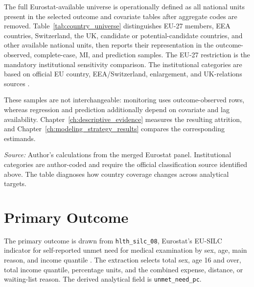 The full Eurostat-available universe is operationally defined as all national units present in the selected outcome and covariate tables after aggregate codes are removed. Table~\ref{tab:country_universe} distinguishes EU-27 members, EEA countries, Switzerland, the UK, candidate or potential-candidate countries, and other available national units, then reports their representation in the outcome-observed, complete-case, MI, and prediction samples. The EU-27 restriction is the mandatory institutional sensitivity comparison. The institutional categories are based on official EU country, EEA/Switzerland, enlargement, and UK-relations sources \citep{eu_countries_2026,europarl_eea_switzerland_2025,european_commission_enlargement_2026,european_commission_uk_relations_2026}.

These samples are not interchangeable: monitoring uses outcome-observed rows, whereas regression and prediction additionally depend on covariate and lag availability. Chapter~\ref{ch:descriptive_evidence} measures the resulting attrition, and Chapter~\ref{ch:modeling_strategy_results} compares the corresponding estimands.

\begin{table}[H]
\centering
\scriptsize
\caption{Country universe and analytical-sample inclusion. Rows report the number of country-years contributed to the outcome-observed panel, baseline complete-case FE sample, MI target, and prediction sample.}
\label{tab:country_universe}

\vspace{0.25em}

\begin{minipage}{0.96\textwidth}
\scriptsize \textit{Source:} Author's calculations from the merged Eurostat panel. Institutional categories are author-coded and require the official classification source identified above. The table diagnoses how country coverage changes across analytical targets.
\end{minipage}
\end{table}

\FloatBarrier

\section{Primary Outcome}

The primary outcome is drawn from \texttt{hlth\_silc\_08}, Eurostat's EU-SILC indicator for self-reported unmet need for medical examination by sex, age, main reason, and income quantile \citep{eurostat_health_variables_metadata,eurostat_unmet_needs_statistics}. The extraction selects total sex, age 16 and over, total income quantile, percentage units, and the combined expense, distance, or waiting-list reason. The derived analytical field is \texttt{unmet\_need\_pc}.


